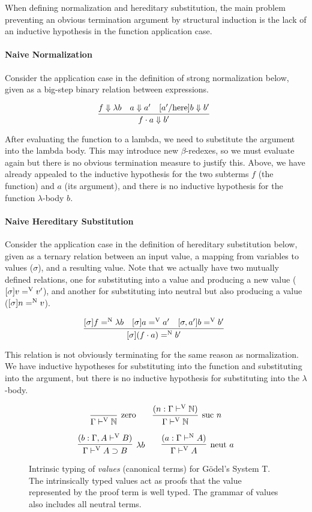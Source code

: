 \documentclass{llncs}
\def\bigstep{\Downarrow}
\def\arr{\supset}
\def\app{\cdot}
\def\lam{\lambda}
\def\nat{\mathbb{N}}
\newcommand{\turn}[1]{\vdash^\con{#1}}
\newcommand{\hsubn}[2]{[\sigma]#1=^\con{N}#2}
\newcommand{\hsub}[2]{[\sigma]#1=^\con{V}#2}
\newcommand{\hsubext}[3]{[\sigma, #1]#2=^\con{V}#3}
\newcommand{\con}[1]{\textmd{#1}}
\newcommand{\fun}[1]{\textmd{#1}}
\newcommand{\typv}[1]{\Gamma \turn{V} #1}
\newcommand{\ctypv}[2]{\Gamma , #1 \turn{V} #2}
\newcommand{\typn}[1]{\Gamma \turn{N} #1}
\begin{document}
When defining normalization and hereditary substitution, the
main problem preventing an obvious termination
argument by structural induction is the lack of
an inductive hypothesis in the function application case.

\paragraph{Naive Normalization}
Consider the application case in the definition of strong normalization
below, given as a big-step binary relation between expressions.

$$
\infer
  []{f \app a \bigstep {b'}}
{
  f \bigstep \lam b
  &
  a \bigstep a'
  &
  [a'/\con{here}]b \bigstep b'
}
$$

After evaluating the function to a lambda, we need to
substitute the argument into the lambda body. This may introduce
new $\beta$-redexes, so we must evaluate again but
there is no obvious termination measure to justify this. Above, we have
already appealed to the inductive hypothesis for the two subterms $f$
(the function) and $a$ (its argument), and there is no inductive
hypothesis for the function $\lambda$-body $b$. 

\paragraph{Naive Hereditary Substitution}
Consider the application case in the definition of hereditary substitution
below, given as a ternary relation between an input value, a mapping from
variables to values ($\sigma$), and a resulting value. Note that we
actually have two mutually defined relations, one for substituting
into a value and producing a new value ($\hsub{v}{v'}$), and another
for substituting into neutral but also producing a value
($\hsubn{n}{v}$).

$$
\infer
   []{\hsubn{(f \app a)}{b'}}
{
  \hsubn{f}{\lam b}
  &
  \hsub{a}{a'}
  &
  \hsubext{a'}{b}{b'}
}
$$

This relation is not obviously terminating for the same reason as
normalization. We have inductive hypotheses for substituting into the
function and substituting into the argument, but there is no inductive hypothesis for
substituting into the $\lambda$-body.

\begin{figure}[t!]
\caption{
Intrinsic typing of \textit{values} (canonical terms) for G{\"o}del's System T.
The intrinsically typed values act as proofs that the value
represented by the proof term is well typed. The grammar of values
also includes all neutral terms.
}
$$
\infer
  [\con{zero}]
  {\typv{\nat}}
{}
\qquad
\infer
  [\con{suc} ~ n]
  {\typv{\nat}}
{
  (n : \typv{\nat})
}
$$

$$
\infer
  [\lam b]
  {\typv{A \arr B}}
{
  (b : \ctypv{A}{B})
}
\qquad
\infer
  [\fun{neut} ~ a]
  {\typv{A}}
{
  (a : \typn{A})
}
$$
\label{fig:typv}
\end{figure}
\end{document}

